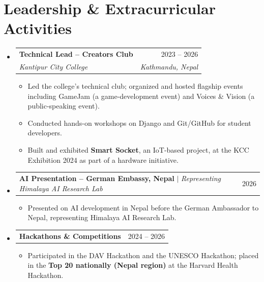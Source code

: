 \documentclass[letterpaper,10pt]{article}
\newcommand{\resumeItem}[1]{
  \item\small{
    {#1 \vspace{-2pt}}
  }
}
\newcommand{\resumeSubheading}[4]{
  \vspace{-2pt}\item
    \begin{tabularx}{\textwidth}[t]{X r}
      \textbf{#1} & #2 \\
      \textit{\small#3} & \textit{\small #4} \\
    \end{tabularx}\vspace{-7pt}
}
\newcommand{\resumeProjectHeading}[2]{
    \item
    \begin{tabularx}{\textwidth}{X r}
      \small#1 & #2 \\
    \end{tabularx}\vspace{-7pt}
}
\newcommand{\resumeSubHeadingListStart}{\begin{itemize}[leftmargin=0.15in, label={}]}
\newcommand{\resumeSubHeadingListEnd}{\end{itemize}}
\newcommand{\resumeItemListStart}{\begin{itemize}}
\newcommand{\resumeItemListEnd}{\end{itemize}\vspace{-2pt}}
\begin{document}
\section{Leadership \& Extracurricular Activities}
    \resumeSubHeadingListStart
      \resumeSubheading
          {Technical Lead -- Creators Club}{2023 -- 2026}
          {Kantipur City College}{Kathmandu, Nepal}
          \resumeItemListStart
            \resumeItem{Led the college's technical club; organized and hosted flagship events including GameJam (a game-development event) and Voices \& Vision (a public-speaking event).}
            \resumeItem{Conducted hands-on workshops on Django and Git/GitHub for student developers.}
            \resumeItem{Built and exhibited \textbf{Smart Socket}, an IoT-based project, at the KCC Exhibition 2024 as part of a hardware initiative.}
          \resumeItemListEnd

      \resumeProjectHeading
          {\textbf{AI Presentation -- German Embassy, Nepal} $|$ \emph{Representing Himalaya AI Research Lab}}{2026}
          \resumeItemListStart
            \resumeItem{Presented on AI development in Nepal before the German Ambassador to Nepal, representing Himalaya AI Research Lab.}
          \resumeItemListEnd

      \resumeProjectHeading
          {\textbf{Hackathons \& Competitions}}{2024 -- 2026}
          \resumeItemListStart
            \resumeItem{Participated in the DAV Hackathon and the UNESCO Hackathon; placed in the \textbf{Top 20 nationally (Nepal region)} at the Harvard Health Hackathon.}
          \resumeItemListEnd
    \resumeSubHeadingListEnd
\end{document}
